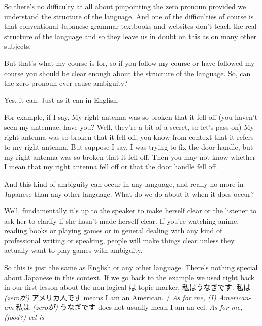 So there's no difficulty at all about pinpointing the zero pronoun provided we understand the structure of the language. And one of the difficulties of course is that conventional Japanese grammar textbooks and websites don't teach the real structure of the language and so they leave us in doubt on this as on many other subjects.

{}

But that's what my course is for, so if you follow my course or have followed my course you should be clear enough about the structure of the language. So, can the zero pronoun ever cause ambiguity?

Yes, it can. Just as it can in English.

{}

For example, if I say, My right antenna was so broken that it fell off (you haven't seen my antennae, have you? Well, they're a bit of a secret, so let's pass on) My right antenna was so broken that it fell off, you know from context that it refers to my right antenna. But suppose I say, I was trying to fix the door handle, but my right antenna was so broken that it fell off. Then you may not know whether I mean that my right antenna fell off or that the door handle fell off.

And this kind of ambiguity can occur in any language, and really no more in Japanese than any other language. What do we do about it when it does occur?

\startsectionlevel[title={The Context Rule},reference={the-context-rule}]

Well, fundamentally it's up to the speaker to make herself clear or the listener to ask her to clarify if she hasn't made herself clear. If you're watching anime, reading books or playing games or in general dealing with any kind of professional writing or speaking, people will make things clear unless they actually want to play games with ambiguity.

So this is just the same as English or any other language. There's nothing special about Japanese in this context. If we go back to the example we used right back in our first lesson about the non-logical は topic marker, 私はうなぎです. 私は {\em (zeroが)} アメリカ人です means I am an American. / {\em As for me, (I) American-am} 私は {\em (zeroが)} うなぎです does not usually mean I am an eel. {\em As for me, (food?) eel-is}

{}

